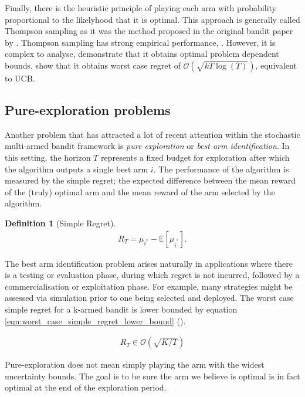 \documentclass[11pt,a4paper,oneside]{book}
\newcommand{\E}[1]{\mathbb E\left[{#1}\right]}
\newcommand{\eqn}[1]{\begin{align}#1\end{align}}
\newcommand{\bigo}[1]{\mathcal{O}\left( #1 \right)}
\newcommand{\simpleregret}{R_T}
\theoremstyle{plain}
\theoremstyle{definition}
\newtheorem{definition}[theorem]{Definition}
\begin{document}
Finally, there is the heuristic principle of playing each arm with probability proportional to the likelyhood that it is optimal. This approach is generally called Thompson sampling as it was the method proposed in the original bandit paper by \citet{Thompson1993}. Thompson sampling has strong empirical performance, \citep{chapelle2011empirical}. However, it is complex to analyse, \citet{kaufmann2012thompson} demonstrate that it obtains optimal problem dependent bounds, \citet{agrawal2013further} show that it obtains worst case regret of $\bigo{\sqrt{kT\log(T)}}$, equivalent to UCB. 

\subsection{Pure-exploration problems}
Another problem that has attracted a lot of recent attention \citep{Bubeck2009,Audibert2010,Gabillon2012,Karnin2013} within the stochastic multi-armed bandit framework is \textit{pure exploration} or \textit{best arm identification}. In this setting, the horizon $T$ represents a fixed budget for exploration after which the algorithm outputs a single best arm $i$. The performance of the algorithm is measured by the simple regret; the expected difference between the mean reward of the (truly) optimal arm and the mean reward of the arm selected by the algorithm.

\vspace{0.5cm}
\begin{definition}[Simple Regret]
\eqn{
\label{eqn:simple_regret}
\simpleregret=\mu_{i^*} - \E{\mu_{\hat i^*}}.
}
\end{definition}

The best arm identification problem arises naturally in applications where there is a testing or evaluation phase, during which regret is not incurred, followed by a commercialisation or exploitation phase. For example, many strategies might be assessed via simulation prior to one being selected and deployed. The worst case simple regret for a k-armed bandit is lower bounded by equation \ref{eqn:worst_case_simple_regret_lower_bound} (\citep{Bubeck2009}).

\eqn{
\label{eqn:worst_case_simple_regret_lower_bound}
\simpleregret \in \bigo{\sqrt{K/T}}
}



Pure-exploration does not mean simply playing the arm with the widest uncertainty bounds. The goal is to be sure the arm we believe is optimal is in fact optimal at the end of the exploration period. 
\end{document}
